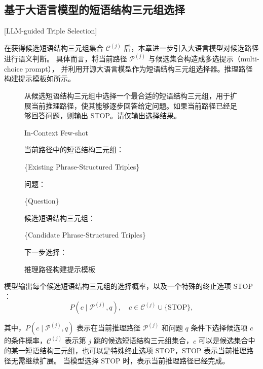 \subsection{基于大语言模型的短语结构三元组选择}[LLM-guided Triple Selection]

在获得候选短语结构三元组集合 $\mathcal{C}^{(j)}$ 后，本章进一步引入大语言模型对候选路径进行语义判断。
具体而言，将当前路径 $\mathcal{P}^{(j)}$ 与候选集合构造成多选提示（multi-choice prompt），
并利用开源大语言模型作为短语结构三元组选择器。推理路径构建提示模板如所示。

\begin{figure}[htbp]
  \centering
  \begin{minipage}{0.9\textwidth}
  \begin{tcolorbox}[title=推理路径构建提示模板, fonttitle=\small, fontupper=\small]
  从候选短语结构三元组中选择一个最合适的短语结构三元组，用于扩展当前推理路径，使其能够逐步回答给定问题。如果当前路径已经足够回答问题，则输出 STOP。请仅输出选择结果。
  
  \vspace{5pt}
  In-Context Few-shot
  
  \vspace{5pt}
  当前路径中的短语结构三元组：
  
  \{Existing Phrase-Structured Triples\}
  
  问题：
  
  \{Question\}
  
  候选短语结构三元组：
  
  \{Candidate Phrase-Structured Triples\}
  
  下一步选择：
  \end{tcolorbox}
  \end{minipage}
  \caption{推理路径构建提示模板}
  \label{fig:skeleton_prompt}
\end{figure}

模型输出每个候选短语结构三元组的选择概率，以及一个特殊的终止选项 $\text{STOP}$：
\begin{equation}
P(c \mid \mathcal{P}^{(j)}, q), \quad c \in \mathcal{C}^{(j)} \cup \{\text{STOP}\},
\end{equation}

\noindent 其中，$P(c \mid \mathcal{P}^{(j)}, q)$ 表示在当前推理路径 $\mathcal{P}^{(j)}$ 和问题 $q$ 条件下选择候选项 $c$ 的条件概率，$\mathcal{C}^{(j)}$ 表示第 $j$ 跳的候选短语结构三元组集合，$c$ 可以是候选集合中的某一短语结构三元组，也可以是特殊终止选项 $\text{STOP}$，$\text{STOP}$ 表示当前推理路径无需继续扩展。
当模型选择 $\text{STOP}$ 时，表示当前推理路径已经完成。

